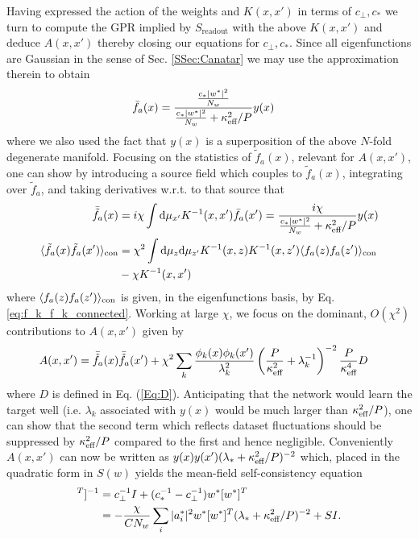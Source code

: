 Having expressed the action of the weights and $K(x,x')$ in terms of $c_{\perp},c_*$ we turn to compute the GPR implied by $S_{\text{readout}}$ with the above $K(x,x')$ and deduce $A(x,x')$ thereby closing our equations for $c_{\perp},c_*$. Since all eigenfunctions are Gaussian in the sense of Sec. \ref{SSec:Canatar} we may use the approximation therein to obtain 
\begin{align}
\bar{f}_{a}(x) &= \frac{\frac{c_* |{w}^*|^2}{N_w}}{\frac{c_* |{w}^*|^2}{N_w}+\kappa^2_{\text{eff}}/P} y(x) 
\end{align}
where we also used the fact that $y(x)$ is a superposition of the above $N$-fold degenerate manifold. Focusing on the statistics of $\tilde{f}_a(x)$, relevant for $A(x,x')$, one can show by introducing a source field which couples to $\tilde{f}_a(x)$, integrating over $\tilde{f}_a$, and taking derivatives w.r.t. to that source that  
\begin{align}
\bar{\tilde{f}}_a(x) &= i \chi \int \text{d} \mu_{x'} K^{-1}(x,x') \bar{f}_a(x') = \frac{i\chi}{\frac{c_* |{w}^*|^2}{N_w}+\kappa^2_{\text{eff}}/P} y(x) \\ \nonumber 
\langle \tilde{f}_a(x)\tilde{f}_a(x')\rangle_{\text{con}} &= \chi^2 \int \text{d} \mu_{z} \text{d}\mu_{z'} K^{-1}(x,z) K^{-1}(x,z') \langle f_a(z)f_a(z') \rangle_{\text{con}}\\ \nonumber &-\chi K^{-1}(x,x')
\end{align}
where $ \langle f_a(z)f_a(z') \rangle_{\text{con}}$ is given, in the eigenfunctions basis, by Eq. \eqref{eq:f_k_f_k_connected}. Working at large $\chi$, we focus on the dominant, $O(\chi^2)$ contributions to $A(x,x')$ given by 
\begin{align}
A(x,x') &= \bar{\tilde{f}}_a(x) \bar{\tilde{f}}_a(x')+\chi^2 \sum_k \frac{\phi_k(x) \phi_k(x')}{\lambda_k^2} \left(\frac{P}{\kappa^2_{\text{eff}}}+\lambda_k^{-1}\right)^{-2} \frac{P}{\kappa^4_{\text{eff}}}D 
\end{align}
where $D$ is defined in Eq. (\ref{Eq:D}). 
Anticipating that the network would learn the target well (i.e. $\lambda_k$ associated with $y(x)$ would be much larger than $\kappa_{\text{eff}}^2/P$), one can show that the second term which reflects dataset fluctuations should be suppressed by $\kappa^2_{\text{eff}}/P$ compared to the first and hence negligible. Conveniently $A(x,x')$ can now be written as $y(x)y(x')(\lambda_* + \kappa_{\text{eff}}^2/P)^{-2}$ which, placed in the quadratic form in $S(w)$ yields the mean-field self-consistency equation 
\begin{align}
[c_{\perp} I + (c_*-c_{\perp}) {w}^* [{w}^*]^T]^{-1} &= c_{\perp}^{-1} I + (c^{-1}_*-c_{\perp}^{-1}) {w}^* [{w}^*]^T \\ \nonumber 
&= -\frac{\chi}{CN_w} \sum_i |a^*_i|^2 {w}^* [{w}^*]^T (\lambda_* + \kappa_{\eff}^2/P)^{-2} + S I. 
\end{align}

